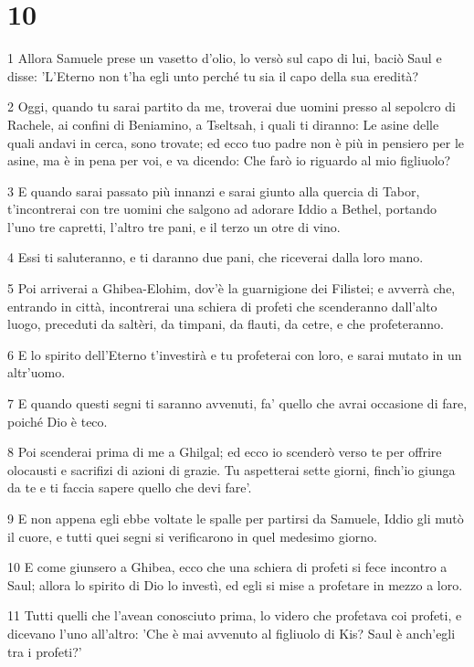 \chapter{10}

\par 1 Allora Samuele prese un vasetto d'olio, lo versò sul capo di lui, baciò Saul e disse: 'L'Eterno non t'ha egli unto perché tu sia il capo della sua eredità?
\par 2 Oggi, quando tu sarai partito da me, troverai due uomini presso al sepolcro di Rachele, ai confini di Beniamino, a Tseltsah, i quali ti diranno: Le asine delle quali andavi in cerca, sono trovate; ed ecco tuo padre non è più in pensiero per le asine, ma è in pena per voi, e va dicendo: Che farò io riguardo al mio figliuolo?
\par 3 E quando sarai passato più innanzi e sarai giunto alla quercia di Tabor, t'incontrerai con tre uomini che salgono ad adorare Iddio a Bethel, portando l'uno tre capretti, l'altro tre pani, e il terzo un otre di vino.
\par 4 Essi ti saluteranno, e ti daranno due pani, che riceverai dalla loro mano.
\par 5 Poi arriverai a Ghibea-Elohim, dov'è la guarnigione dei Filistei; e avverrà che, entrando in città, incontrerai una schiera di profeti che scenderanno dall'alto luogo, preceduti da saltèri, da timpani, da flauti, da cetre, e che profeteranno.
\par 6 E lo spirito dell'Eterno t'investirà e tu profeterai con loro, e sarai mutato in un altr'uomo.
\par 7 E quando questi segni ti saranno avvenuti, fa' quello che avrai occasione di fare, poiché Dio è teco.
\par 8 Poi scenderai prima di me a Ghilgal; ed ecco io scenderò verso te per offrire olocausti e sacrifizi di azioni di grazie. Tu aspetterai sette giorni, finch'io giunga da te e ti faccia sapere quello che devi fare'.
\par 9 E non appena egli ebbe voltate le spalle per partirsi da Samuele, Iddio gli mutò il cuore, e tutti quei segni si verificarono in quel medesimo giorno.
\par 10 E come giunsero a Ghibea, ecco che una schiera di profeti si fece incontro a Saul; allora lo spirito di Dio lo investì, ed egli si mise a profetare in mezzo a loro.
\par 11 Tutti quelli che l'avean conosciuto prima, lo videro che profetava coi profeti, e dicevano l'uno all'altro: 'Che è mai avvenuto al figliuolo di Kis? Saul è anch'egli tra i profeti?'
